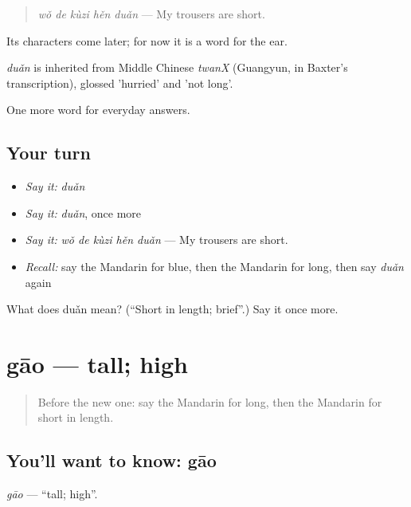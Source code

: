 \begin{quote}
\emph{wǒ de kùzi hěn duǎn} — My trousers are short.
\end{quote}

Its characters come later; for now it is a word for the ear.

\begin{cousinweb}
\emph{duǎn} is inherited from Middle Chinese \emph{twanX} (Guangyun, in Baxter's transcription), glossed 'hurried' and 'not long'.
\end{cousinweb}

\begin{grammarlens}[title={What you've built}]
One more word for everyday answers.
\end{grammarlens}

\subsection*{Your turn}
\begin{itemize}
\raggedright
  \item \emph{Say it:} \emph{duǎn}
  \item \emph{Say it:} \emph{duǎn}, once more
  \item \emph{Say it:} \emph{wǒ de kùzi hěn duǎn} — My trousers are short.
  \item \emph{Recall:} say the Mandarin for blue, then the Mandarin for long, then say \emph{duǎn} again
\end{itemize}

\begin{tcolorbox}[breakable,colback=teal!4,colframe=teal!35!black,title={Before you move on}]
What does duǎn mean? (\textquotedblleft{}Short in length; brief\textquotedblright{}.) Say it once more.
\end{tcolorbox}
\section[gāo]{gāo — tall; high}

\label{lesson:ZH-C61-gao}



\begin{quote}
Before the new one: say the Mandarin for long, then the Mandarin for short in length.
\end{quote}

\subsection*{You'll want to know: gāo}
\emph{gāo} — \textquotedblleft{}tall; high\textquotedblright{}.

